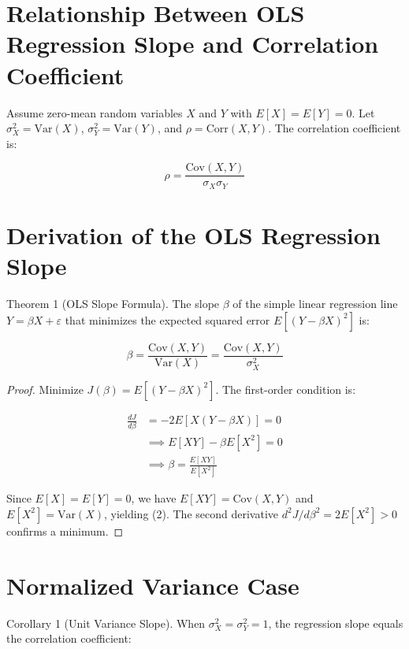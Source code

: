 \documentclass{article}
\begin{document}
\section*{Relationship Between OLS Regression Slope and Correlation Coefficient}

Assume zero-mean random variables $X$ and $Y$ with $E[X] = E[Y] = 0$. Let $\sigma_X^2 = \text{Var}(X)$, $\sigma_Y^2 = \text{Var}(Y)$, and $\rho = \text{Corr}(X,Y)$. The correlation coefficient is:

\begin{equation}
    \rho = \frac{\text{Cov}(X,Y)}{\sigma_X \sigma_Y}
\end{equation}

\section*{Derivation of the OLS Regression Slope}

Theorem 1 (OLS Slope Formula). The slope $\beta$ of the simple linear regression line $Y = \beta X + \varepsilon$ that minimizes the expected squared error $E[(Y - \beta X)^2]$ is:

\begin{equation}
    \boxed{\beta = \frac{\text{Cov}(X,Y)}{\text{Var}(X)} = \frac{\text{Cov}(X,Y)}{\sigma_X^2}}
\end{equation}

\begin{proof}
Minimize $J(\beta) = E[(Y - \beta X)^2]$. The first-order condition is:

\begin{align*}
    \frac{dJ}{d\beta} &= -2E[X(Y - \beta X)] = 0 \\
    &\implies E[XY] - \beta E[X^2] = 0 \\
    &\implies \beta = \frac{E[XY]}{E[X^2]}
\end{align*}

Since $E[X] = E[Y] = 0$, we have $E[XY] = \text{Cov}(X,Y)$ and $E[X^2] = \text{Var}(X)$, yielding (2). The second derivative $d^2J/d\beta^2 = 2E[X^2] > 0$ confirms a minimum.
\end{proof}

\section*{Normalized Variance Case}

Corollary 1 (Unit Variance Slope). When $\sigma_X^2 = \sigma_Y^2 = 1$, the regression slope equals the correlation coefficient:
\end{document}
